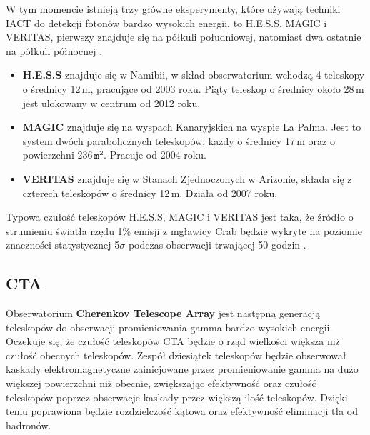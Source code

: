 \documentclass[a4paper,11pt,twoside]{article}
\begin{document}
W tym momencie istnieją trzy główne eksperymenty, które używają techniki IACT do detekcji fotonów bardzo wysokich energii, to H.E.S.S, MAGIC i VERITAS, pierwszy znajduje się na półkuli południowej, natomiast dwa ostatnie na półkuli północnej \cite{particle_de_angelis}. 
\begin{itemize}
\item {\bf{H.E.S.S}} \cite{hess} znajduje się w Namibii, w skład obserwatorium wchodzą 4 teleskopy o średnicy 12\,m, pracujące od 2003 roku. Piąty teleskop o średnicy około 28\,m jest ulokowany w centrum od 2012 roku.
\item {\bf{MAGIC}} \cite{magic} znajduje się na wyspach Kanaryjskich na wyspie La Palma. Jest to system dwóch parabolicznych teleskopów, każdy o średnicy 17\,m oraz o powierzchni 236\,$\mathtt{m^2}$. Pracuje od 2004 roku.
\item {\bf{VERITAS}} \cite{veritas} znajduje się w Stanach Zjednoczonych w Arizonie, składa się z czterech teleskopów o średnicy 12\,m. Działa od 2007 roku.
\end{itemize}
Typowa czułość teleskopów H.E.S.S, MAGIC i VERITAS jest taka, że źródło o  strumieniu światła rzędu 1\% emisji z mgławicy Crab będzie wykryte na poziomie znaczności statystycznej 5$\sigma$ podczas obserwacji trwającej 50 godzin \cite{particle_de_angelis}. 
\newpage
\subsection{CTA}
Obserwatorium {\bf{Cherenkov Telescope Array}} jest następną generacją teleskopów do obserwacji promieniowania gamma bardzo wysokich energii. Oczekuje się, że czułość teleskopów CTA będzie o rząd wielkości większa niż czułość obecnych teleskopów. 
Zespół dziesiątek teleskopów będzie obserwował kaskady elektromagnetyczne zainicjowane przez promieniowanie gamma na dużo większej powierzchni niż obecnie, zwiększając efektywność oraz czułość teleskopów poprzez obserwacje kaskady przez większą ilość teleskopów. Dzięki temu poprawiona będzie rozdzielczość kątowa oraz efektywność eliminacji tła od hadronów.
\end{document}
